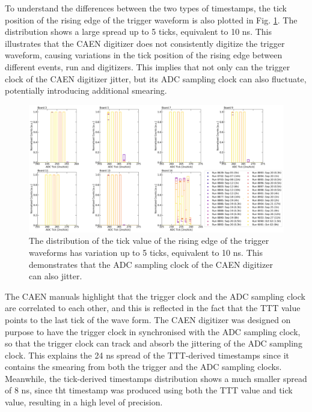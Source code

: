 To understand the differences between the two types of timestamps, the tick position of the rising edge of the trigger waveform is also plotted in Fig. \ref {fig:TickSPEC}.
The distribution shows a large spread up to 5 ticks, equivalent to 10 ns.
This illustrates that the CAEN digitizer does not consistently digitize the trigger waveform, causing variations in the tick position of the rising edge between different events, run and digitizers.
This implies that not only can the trigger clock of the CAEN digitizer jitter, but its ADC sampling clock can also fluctuate, potentially introducing additional smearing.

\begin{figure}[htbp!]
\centering    
\includegraphics[width=\linewidth]{Tick_spec}
\caption[TickSPEC]{
The distribution of the tick value of the rising edge of the trigger waveforms has variation up to 5 ticks, equivalent to 10 ns. 
This demonstrates that the ADC sampling clock of the CAEN digitizer can also jitter.
}
\label{fig:TickSPEC}
\end{figure}

The CAEN manuals highlight that the trigger clock and the ADC sampling clock are correlated to each other, and this is reflected in the fact that the TTT value points to the last tick of the wave form.
The CAEN digitizer was designed on purpose to have the trigger clock in synchronised with the ADC sampling clock, so that the trigger clock can track and absorb the jittering of the ADC sampling clock.
This explains the 24 ns spread of the TTT-derived timestamps since it contains the smearing from both the trigger and the ADC sampling clocks.
Meanwhile, the tick-derived timestamps distribution shows a much smaller spread of 8 ns, since tht timestamp was produced using both the TTT value and tick value, resulting in a high level of precision.

